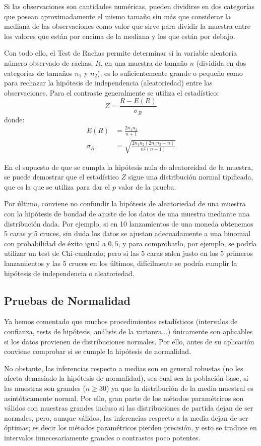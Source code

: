 Si las observaciones son cantidades numéricas, pueden dividirse en dos categorías que posean aproximadamente el mismo tamaño sin más que
considerar la mediana de las observaciones como valor que sirve para dividir la muestra entre los valores que están por encima de la mediana
y los que están por debajo.

Con todo ello, el Test de Rachas permite determinar si la variable aleatoria número observado de rachas, $R$, en una muestra de tamaño $n$
(dividida en dos categorías de tamaños $n_1$ y $n_2$), es lo suficientemente grande o pequeño como para rechazar la hipótesis de
independencia (aleatoriedad) entre las observaciones. Para el contraste generalmente se utiliza el estadístico:
\[
Z = \frac{{R - E(R)}}{{\sigma _R }}
\]
donde:
\begin{align*}
E(R) &= \frac{{2n_1 n_2 }}{{n + 1}}\\
\sigma _R  &= \sqrt {\frac{{2n_1 n_2 \left( {2n_1 n_2  - n} \right)}}{{n^2 \left( {n + 1} \right)}}}
\end{align*}

En el supuesto de que se cumpla la hipótesis nula de aleatoreidad de la muestra, se puede demostrar que el estadístico $Z$ sigue una
distribución normal tipificada, que es la que se utiliza para dar el $p$ valor de la prueba.

Por último, conviene no confundir la hipótesis de aleatoriedad de una muestra con la hipótesis de bondad de ajuste de los datos de una
muestra mediante una distribución dada. Por ejemplo, si en 10 lanzamientos de una moneda obtenemos 5 caras y 5 cruces, sin duda los datos se
ajustan adecuadamente a una binomial con probabilidad de éxito igual a $0,5$, y para comprobarlo, por ejemplo, se podría utilizar un test de
Chi-cuadrado; pero si las 5 caras salen justo en los 5 primeros lanzamientos y las 5 cruces en los últimos, difícilmente se podría cumplir
la hipótesis de independencia o aleatoriedad.


\subsection{Pruebas de Normalidad}
Ya hemos comentado que muchos procedimientos estadísticos (intervalos de confianza, tests de hipótesis, análisis de la varianza...)
únicamente son aplicables si los datos provienen de distribuciones normales. Por ello, antes de su aplicación conviene comprobar si se
cumple la hipótesis de normalidad.

No obstante, las inferencias respecto a medias son en general robustas (no les afecta demasiado la hipótesis de normalidad), sea cual sea la
población base, si las muestras son grandes ($n\geq30$) ya que la distribución de la media muestral es asintóticamente normal. Por ello,
gran parte de los métodos paramétricos son válidos con muestras grandes incluso si las distribuciones de partida dejan de ser normales,
pero, aunque válidos, las inferencias respecto a la media dejan de ser óptimas; es decir los métodos paramétricos pierden precisión, y esto
se traduce en intervalos innecesariamente grandes o contrastes poco potentes.

